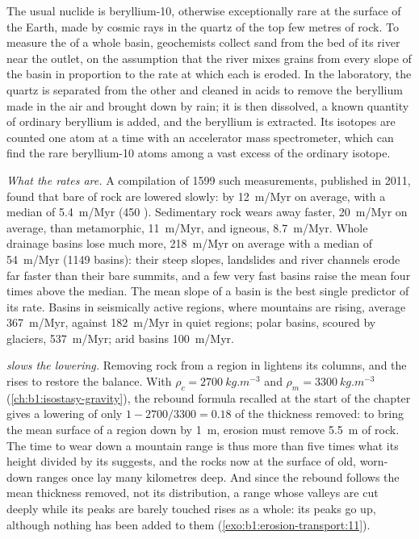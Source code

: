 \begin{inthelab}
The usual nuclide is beryllium-10, otherwise exceptionally rare at the
surface of the Earth, made by cosmic rays in the quartz of the top few metres
of rock. To measure
the  of a whole basin, geochemists collect sand from the bed of
its river near the outlet, on the assumption that the river mixes grains from
every slope of the basin in proportion to the rate at which each is eroded. In
the laboratory, the quartz is separated from the other  and cleaned in
acids to remove the beryllium made in the air and brought down by rain; it is then
dissolved, a known quantity of ordinary beryllium is added, and the beryllium
is extracted. Its isotopes are counted one atom at a time with an accelerator
mass spectrometer, which can find the rare beryllium-10 atoms among a vast
excess of the ordinary isotope.
\end{inthelab}

\emph{What the rates are.} A compilation of \num{1599} such measurements,
published in 2011, found that bare  of rock are lowered slowly: by
\qty{12}{m/Myr} on average, with a median of \qty{5.4}{m/Myr} (450 ).
Sedimentary rock wears away faster, \qty{20}{m/Myr} on average, than
metamorphic, \qty{11}{m/Myr}, and igneous, \qty{8.7}{m/Myr}. Whole drainage
basins lose much more, \qty{218}{m/Myr} on average with a median of
\qty{54}{m/Myr} (\num{1149} basins): their steep slopes, landslides and river
channels erode far faster than their bare summits, and a few very fast basins
raise the mean four times above the median. The mean slope of a basin is the
best single predictor of its rate. Basins in seismically active regions, where
mountains are rising, average \qty{367}{m/Myr}, against \qty{182}{m/Myr} in
quiet regions; polar basins, scoured by glaciers, \qty{537}{m/Myr}; arid basins
\qty{100}{m/Myr}.

\emph{ slows the lowering.} Removing rock from a region in 
lightens its columns, and the  rises to restore the balance. With $\rho_c
= \qty{2700}{kg.m^{-3}}$ and $\rho_m = \qty{3300}{kg.m^{-3}}$
(\cref{ch:b1:isostasy-gravity}), the rebound formula recalled at the start of
the chapter gives a lowering of only $1 - 2700/3300 = 0.18$ of the thickness
removed: to bring the mean surface of a region down by \qty{1}{m}, erosion must
remove \qty{5.5}{m} of rock. The time to wear down a mountain range is thus
more than five times what its height divided by its  suggests,
and the rocks now at the surface of old, worn-down ranges once lay many
kilometres deep. And since the rebound follows the mean thickness removed,
not its distribution, a range whose valleys are cut deeply while its peaks are
barely touched rises as a whole: its peaks go up, although nothing has been
added to them (\cref{exo:b1:erosion-transport:11}).

